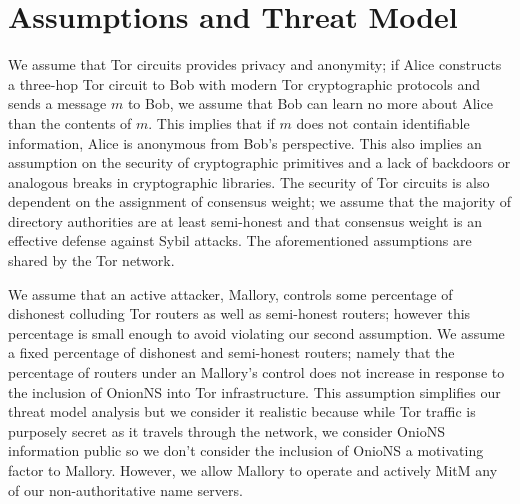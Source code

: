 \documentclass[USenglish,oneside,twocolumn]{article}
\begin{document}

\section{Assumptions and Threat Model}
\label{sec:threatModel}

We assume that Tor circuits provides privacy and anonymity; if Alice constructs a three-hop Tor circuit to Bob with modern Tor cryptographic protocols and sends a message $ m $ to Bob, we assume that Bob can learn no more about Alice than the contents of $ m $. This implies that if $ m $ does not contain identifiable information, Alice is anonymous from Bob's perspective. This also implies an assumption on the security of cryptographic primitives and a lack of backdoors or analogous breaks in cryptographic libraries. The security of Tor circuits is also dependent on the assignment of consensus weight; we assume that the majority of directory authorities are at least semi-honest and that consensus weight is an effective defense against Sybil attacks. The aforementioned assumptions are shared by the Tor network.

We assume that an active attacker, Mallory, controls some percentage of dishonest colluding Tor routers as well as semi-honest routers; however this percentage is small enough to avoid violating our second assumption. We assume a fixed percentage of dishonest and semi-honest routers; namely that the percentage of routers under an Mallory's control does not increase in response to the inclusion of OnionNS into Tor infrastructure. This assumption simplifies our threat model analysis but we consider it realistic because while Tor traffic is purposely secret as it travels through the network, we consider OnioNS information public so we don't consider the inclusion of OnioNS a motivating factor to Mallory. However, we allow Mallory to operate and actively MitM any of our non-authoritative name servers.

\end{document}

